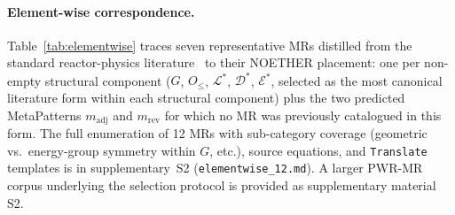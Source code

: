 \documentclass[acmsmall,screen,review]{acmart}
\begin{document}
\paragraph{Element-wise correspondence.} Table~\ref{tab:elementwise} traces seven representative MRs distilled from the standard reactor-physics literature~\cite{BellGlasstone1970, LewisMiller1993} to their NOETHER placement: one per non-empty structural component ($G$, $O_{\le}$, $\mathcal{L}^{*}$, $\mathcal{D}^{*}$, $\mathcal{E}^{*}$, selected as the most canonical literature form within each structural component) plus the two predicted MetaPatterns $m_{\mathrm{adj}}$ and $m_{\mathrm{rev}}$ for which no MR was previously catalogued in this form. The full enumeration of 12 MRs with sub-category coverage (geometric vs.\ energy-group symmetry within $G$, etc.), source equations, and \texttt{Translate} templates is in supplementary~S2 (\texttt{elementwise\_12.md}). A larger PWR-MR corpus underlying the selection protocol is provided as supplementary material S2.
\end{document}
